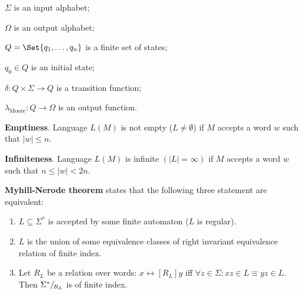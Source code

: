 \documentclass[a4paper,10pt]{article}
\begin{document}
\begin{terms}
\begin{minipage}{\linewidth}
    \begin{terms}
        \item $\Sigma$ is an input alphabet;

        \item $\Omega$ is an output alphabet;

        \item $Q = \Set{q_1, \dots, q_n}$ is a finite set of states;

        \item $q_0 \in Q$ is an initial state;

        \item $\delta \colon Q \times \Sigma \to Q$ is a transition function;

        \item $\lambda_\text{Moore} \colon Q \to \Omega$ is an output function.
    \end{terms}

    \end{minipage}

    \item \textbf{Emptiness}.
    Language $L(M)$ is not empty ($L \neq \emptyset$) if $M$ accepts a word $w$ such that $|w| \leq n$.

    \item \textbf{Infiniteness}.
    Language $L(M)$ is infinite $(|L| = \infty)$ if $M$ accepts a word $w$ such that $n \leq |w| < 2n$.

    \item \textbf{Myhill-Nerode theorem} states that the following three statement are equivalent:

    \begin{enumerate}
        \item $L \subseteq \Sigma^*$ is accepted by some finite automaton ($L$ is regular).

        \item $L$ is the union of some equivalence classes of right invariant equivalence relation of finite index.

        \item Let $R_L$ be a relation over words: $x \rel[R_L] y$ iff $\forall z \in \Sigma : xz \in L \equiv yz \in L$.
        Then $\quotient[R_L]{\Sigma^*}$ is of finite index.
    \end{enumerate}


\end{terms}
\end{document}
